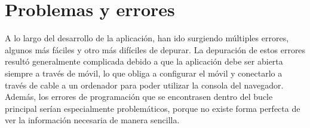 \documentclass{subfiles}
\begin{document}
    \section{Problemas y errores}
    \label{sec:problemas_y_errores}
    A lo largo del desarrollo de la aplicación, han ido surgiendo múltiples errores, algunos más fáciles y otro más difíciles de depurar. La depuración de estos errores resultó generalmente complicada debido a que la aplicación debe ser abierta siempre a través de móvil, lo que obliga a configurar el móvil y conectarlo a través de cable a un ordenador para poder utilizar la consola del navegador. Además, los errores de programación que se encontrasen dentro del bucle principal serían especialmente problemáticos, porque no existe forma perfecta de ver la información necesaria de manera sencilla.
\end{document}
